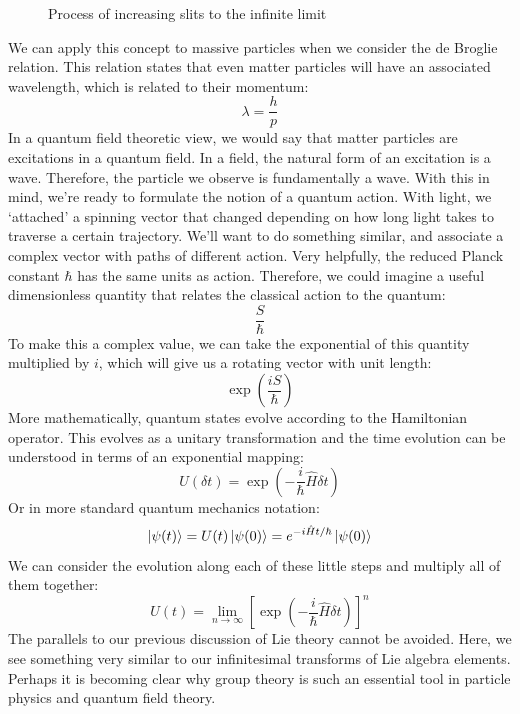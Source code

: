 \begin{figure}[ht]
\begin{tikzpicture}[x=0.75pt,y=0.75pt,yscale=-1,xscale=1]
\end{tikzpicture}

    \caption{Process of increasing slits to the infinite limit}
    \label{fig:infinite slits}
\end{figure}
We can apply this concept to massive particles when we consider the de Broglie relation. This relation states that even matter particles will have an associated wavelength, which is related to their momentum:
$$\lambda=\frac{h}{p}$$
In a quantum field theoretic view, we would say that matter particles are excitations in a quantum field. In a field, the natural form of an excitation is a wave. Therefore, the particle we observe is fundamentally a wave. With this in mind, we're ready to formulate the notion of a quantum action. With light, we `attached' a spinning vector that changed depending on how long light takes to traverse a certain trajectory. We'll want to do something similar, and associate a complex vector with paths of different action. Very helpfully, the reduced Planck constant $\hbar$ has the same units as action. Therefore, we could imagine a useful dimensionless quantity that relates the classical action to the quantum: $$\frac{S}{\hbar}$$ To make this a complex value, we can take the exponential of this quantity multiplied by $i$, which will give us a rotating vector with unit length:
$$\exp\left({\frac{iS}{\hbar}}\right)$$
More mathematically, quantum states evolve according to the \gls{Hamiltonian} operator. This evolves as a unitary transformation and the time evolution can be understood in terms of an exponential mapping:
$$U(\delta t)=\exp(-\frac{i}{\hbar}\hat{H}\delta t)$$
Or in more standard quantum mechanics notation:
$$\ket{\psi(t)}=U(t)\ket{\psi(0)}=e^{-i\hat{H}t/\hbar}\ket{\psi(0)}$$
We can consider the evolution along each of these little steps and multiply all of them together:
$$U(t)=\lim_{n\rightarrow\infty}\left[\exp\left(-\frac{i}{\hbar}\hat{H}\delta t\right)\right]^n$$
The parallels to our previous discussion of Lie theory cannot be avoided. Here, we see something very similar to our infinitesimal transforms of Lie algebra elements. Perhaps it is becoming clear why group theory is such an essential tool in particle physics and quantum field theory.

